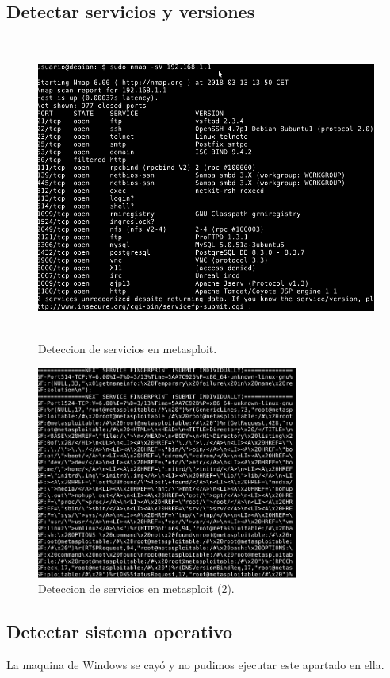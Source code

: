 \documentclass[11pt]{article}
\begin{document}
    \subsection{Detectar servicios y versiones}
      \begin{figure}[H]
        \centering
        \includegraphics[width = \textwidth, height = 10cm]{sondeo13}
        \caption{Deteccion de servicios en metasploit.}
      \end{figure}

      \begin{figure}[H]
        \centering
        \includegraphics[width = \textwidth, height = 7cm]{sondeo14}
        \caption{Deteccion de servicios en metasploit (2).}
      \end{figure}

    \subsection{Detectar sistema operativo}
      \par
      La maquina de Windows se cayó y no pudimos ejecutar este apartado en ella.
\end{document}
